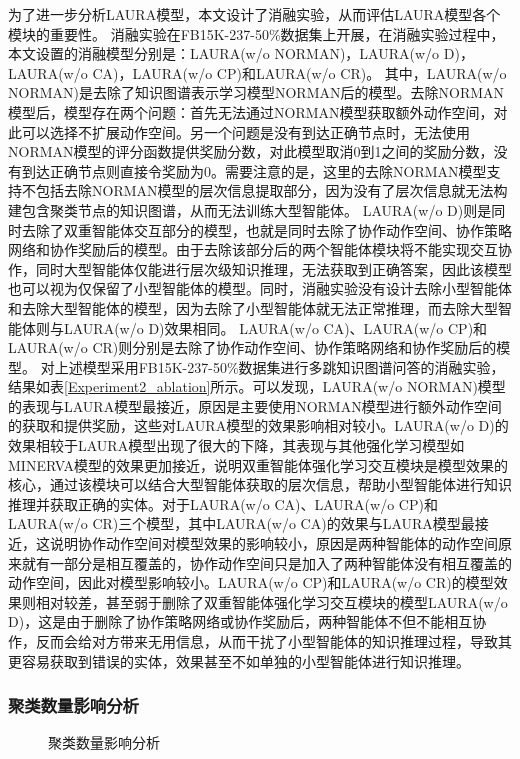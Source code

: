 \documentclass[algorithmlist, AutoFakeBold, AutoFakeSlant, figurelist, tablelist, nomlist, engineering]{seuthesix}
\begin{document}
为了进一步分析LAURA模型，本文设计了消融实验，从而评估LAURA模型各个模块的重要性。
消融实验在FB15K-237-50\%数据集上开展，在消融实验过程中，本文设置的消融模型分别是：LAURA(w/o NORMAN)，LAURA(w/o D)，LAURA(w/o CA)，LAURA(w/o CP)和LAURA(w/o CR)。
其中，LAURA(w/o NORMAN)是去除了知识图谱表示学习模型NORMAN后的模型。去除NORMAN模型后，模型存在两个问题：首先无法通过NORMAN模型获取额外动作空间，对此可以选择不扩展动作空间。另一个问题是没有到达正确节点时，无法使用NORMAN模型的评分函数提供奖励分数，对此模型取消0到1之间的奖励分数，没有到达正确节点则直接令奖励为0。需要注意的是，这里的去除NORMAN模型支持不包括去除NORMAN模型的层次信息提取部分，因为没有了层次信息就无法构建包含聚类节点的知识图谱，从而无法训练大型智能体。
LAURA(w/o D)则是同时去除了双重智能体交互部分的模型，也就是同时去除了协作动作空间、协作策略网络和协作奖励后的模型。由于去除该部分后的两个智能体模块将不能实现交互协作，同时大型智能体仅能进行层次级知识推理，无法获取到正确答案，因此该模型也可以视为仅保留了小型智能体的模型。同时，消融实验没有设计去除小型智能体和去除大型智能体的模型，因为去除了小型智能体就无法正常推理，而去除大型智能体则与LAURA(w/o D)效果相同。
LAURA(w/o CA)、LAURA(w/o CP)和LAURA(w/o CR)则分别是去除了协作动作空间、协作策略网络和协作奖励后的模型。
对上述模型采用FB15K-237-50\%数据集进行多跳知识图谱问答的消融实验，结果如表\ref{Experiment2_ablation}所示。可以发现，LAURA(w/o NORMAN)模型的表现与LAURA模型最接近，原因是主要使用NORMAN模型进行额外动作空间的获取和提供奖励，这些对LAURA模型的效果影响相对较小。LAURA(w/o D)的效果相较于LAURA模型出现了很大的下降，其表现与其他强化学习模型如MINERVA模型的效果更加接近，说明双重智能体强化学习交互模块是模型效果的核心，通过该模块可以结合大型智能体获取的层次信息，帮助小型智能体进行知识推理并获取正确的实体。对于LAURA(w/o CA)、LAURA(w/o CP)和LAURA(w/o CR)三个模型，其中LAURA(w/o CA)的效果与LAURA模型最接近，这说明协作动作空间对模型效果的影响较小，原因是两种智能体的动作空间原来就有一部分是相互覆盖的，协作动作空间只是加入了两种智能体没有相互覆盖的动作空间，因此对模型影响较小。LAURA(w/o CP)和LAURA(w/o CR)的模型效果则相对较差，甚至弱于删除了双重智能体强化学习交互模块的模型LAURA(w/o D)，这是由于删除了协作策略网络或协作奖励后，两种智能体不但不能相互协作，反而会给对方带来无用信息，从而干扰了小型智能体的知识推理过程，导致其更容易获取到错误的实体，效果甚至不如单独的小型智能体进行知识推理。

\subsubsection{聚类数量影响分析}
\begin{figure}[t]
  \centering
  \caption{聚类数量影响分析}
  \label{Experiment2_layer}
\end{figure}
\end{document}
